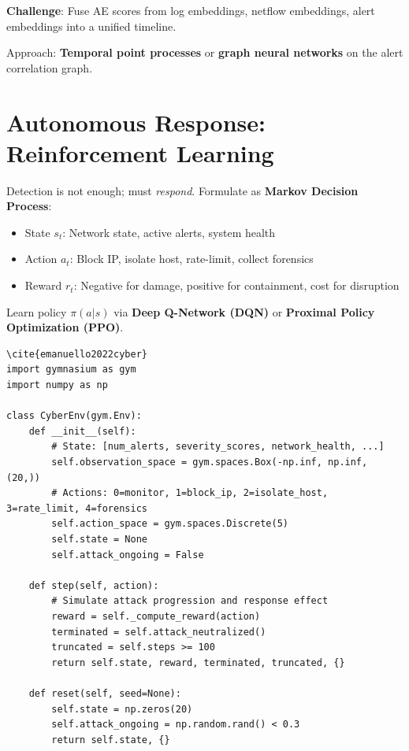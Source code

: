 \textbf{Challenge}: Fuse AE scores from log embeddings, netflow embeddings, alert embeddings into a unified timeline.

Approach: \textbf{Temporal point processes} or \textbf{graph neural networks} on the alert correlation graph.

\section{Autonomous Response: Reinforcement Learning}
\label{sec:cyber:rl} \cite{emanuello2022cyber}

Detection is not enough; must \emph{respond}. Formulate as \textbf{Markov Decision Process}:
\begin{itemize}
    \item State $s_t$: Network state, active alerts, system health
    \item Action $a_t$: Block IP, isolate host, rate-limit, collect forensics
    \item Reward $r_t$: Negative for damage, positive for containment, cost for disruption
\end{itemize}

Learn policy $\pi(a|s)$ via \textbf{Deep Q-Network (DQN)} or \textbf{Proximal Policy Optimization (PPO)}.

\begin{lstlisting}[style=python,caption=RL environment for cyber response] \cite{emanuello2022cyber}
import gymnasium as gym
import numpy as np

class CyberEnv(gym.Env):
    def __init__(self):
        # State: [num_alerts, severity_scores, network_health, ...]
        self.observation_space = gym.spaces.Box(-np.inf, np.inf, (20,))
        # Actions: 0=monitor, 1=block_ip, 2=isolate_host, 3=rate_limit, 4=forensics
        self.action_space = gym.spaces.Discrete(5)
        self.state = None
        self.attack_ongoing = False
    
    def step(self, action):
        # Simulate attack progression and response effect
        reward = self._compute_reward(action)
        terminated = self.attack_neutralized()
        truncated = self.steps >= 100
        return self.state, reward, terminated, truncated, {}
    
    def reset(self, seed=None):
        self.state = np.zeros(20)
        self.attack_ongoing = np.random.rand() < 0.3
        return self.state, {}
\end{lstlisting}

